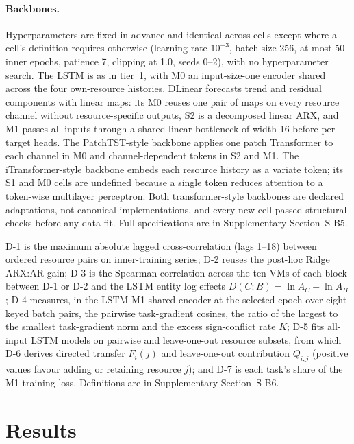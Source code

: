 

\paragraph{Backbones.} Hyperparameters are fixed in advance and identical
across cells except where a cell's definition requires otherwise (learning
rate $10^{-3}$, batch size 256, at most 50 inner epochs, patience 7, clipping
at 1.0, seeds 0--2), with no hyperparameter search. The LSTM is as in tier~1,
with M0 an input-size-one encoder shared across the four own-resource
histories. DLinear \citep{Zeng2023DLinear} forecasts trend and residual
components with linear maps: its M0 reuses one pair of maps on every
resource channel without resource-specific outputs, S2 is a decomposed linear
ARX, and M1 passes all inputs through a shared linear bottleneck of width 16
before per-target heads. The PatchTST-style backbone \citep{Nie2023PatchTST}
applies one patch Transformer to each channel in M0 and channel-dependent
tokens in S2 and M1. The iTransformer-style backbone
\citep{Liu2024iTransformer} embeds each resource history as a variate token;
its S1 and M0 cells are undefined because a single token reduces attention to
a token-wise multilayer perceptron. Both transformer-style backbones are
declared adaptations, not canonical implementations, and every new cell
passed structural checks before any data fit. Full specifications are in
Supplementary Section~S-B5.

D-1 is the maximum absolute lagged cross-correlation (lags 1--18) between
ordered resource pairs on inner-training series; D-2 reuses the post-hoc Ridge
ARX:AR gain; D-3 is the Spearman correlation across the ten VMs of each block
between D-1 or D-2 and the LSTM entity log effects
$D(C\!:\!B)=\ln A_C-\ln A_B$; D-4 measures, in the LSTM M1 shared encoder at
the selected epoch over eight keyed batch pairs, the pairwise task-gradient
cosines, the ratio of the largest to the smallest task-gradient norm and the
excess sign-conflict rate $K$; D-5 fits all-input LSTM models on pairwise and
leave-one-out resource subsets, from which D-6 derives directed transfer
$F_i(j)$ and leave-one-out contribution $Q_{i,j}$ (positive values favour
adding or retaining resource $j$); and D-7 is each task's share of the M1
training loss. Definitions are in Supplementary Section~S-B6.

\section{Results}

